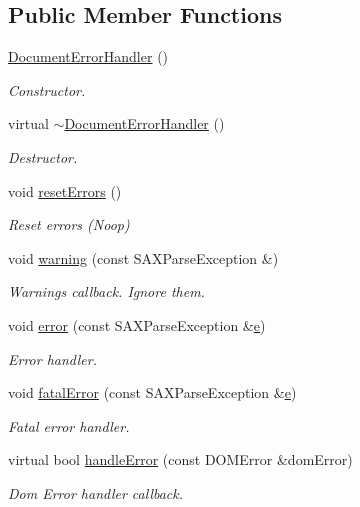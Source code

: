 \subsection*{Public Member Functions}
\begin{DoxyCompactItemize}
\item 
\hyperlink{class_d_d4hep_1_1_x_m_l_1_1_document_error_handler_aa887197fc5ae8d3a7463307a36dad8b2}{Document\+Error\+Handler} ()
\begin{DoxyCompactList}\small\item\em Constructor. \end{DoxyCompactList}\item 
virtual \hyperlink{class_d_d4hep_1_1_x_m_l_1_1_document_error_handler_a2444e9636a7fe532b865aab9e7b3c676}{$\sim$\+Document\+Error\+Handler} ()
\begin{DoxyCompactList}\small\item\em Destructor. \end{DoxyCompactList}\item 
void \hyperlink{class_d_d4hep_1_1_x_m_l_1_1_document_error_handler_aed02c6f154e651f714709b8448ba8fe4}{reset\+Errors} ()
\begin{DoxyCompactList}\small\item\em Reset errors (Noop) \end{DoxyCompactList}\item 
void \hyperlink{class_d_d4hep_1_1_x_m_l_1_1_document_error_handler_aea72a4df771def82a559fb89bee54489}{warning} (const S\+A\+X\+Parse\+Exception \&)
\begin{DoxyCompactList}\small\item\em Warnings callback. Ignore them. \end{DoxyCompactList}\item 
void \hyperlink{class_d_d4hep_1_1_x_m_l_1_1_document_error_handler_a1a39025b14996aa817e9f42da6076d30}{error} (const S\+A\+X\+Parse\+Exception \&\hyperlink{_volumes_8cpp_a8a9a1f93e9b09afccaec215310e64142}{e})
\begin{DoxyCompactList}\small\item\em Error handler. \end{DoxyCompactList}\item 
void \hyperlink{class_d_d4hep_1_1_x_m_l_1_1_document_error_handler_a2a765977361e8acb377a304c313bbcd3}{fatal\+Error} (const S\+A\+X\+Parse\+Exception \&\hyperlink{_volumes_8cpp_a8a9a1f93e9b09afccaec215310e64142}{e})
\begin{DoxyCompactList}\small\item\em Fatal error handler. \end{DoxyCompactList}\item 
virtual bool \hyperlink{class_d_d4hep_1_1_x_m_l_1_1_document_error_handler_a830b9a2a1ae3a2e35ae753b70ae18c52}{handle\+Error} (const D\+O\+M\+Error \&dom\+Error)
\begin{DoxyCompactList}\small\item\em Dom Error handler callback. \end{DoxyCompactList}\end{DoxyCompactItemize}



